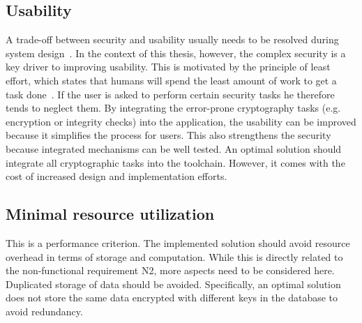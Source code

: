 \documentclass[../main.tex]{subfiles}
\begin{document}
\subsection{Usability}
A trade-off between security and usability usually needs to be resolved during system design~\cite{Braz2007}.
In the context of this thesis, however, the complex security is a key driver to improving usability.
This is motivated by the principle of least effort, which states that humans will spend the least amount of work to get a task done~\cite{Levenson2018}.
If the user is asked to perform certain security tasks he therefore tends to neglect them.
By integrating the error-prone cryptography tasks (e.g. encryption or integrity checks) into the application, the usability can be improved because it simplifies the process for users.
This also strengthens the security because integrated mechanisms can be well tested.
An optimal solution should integrate all cryptographic tasks into the toolchain.
However, it comes with the cost of increased design and implementation efforts.

\subsection{Minimal resource utilization}
This is a performance criterion.
The implemented solution should avoid resource overhead in terms of storage and computation.
While this is directly related to the non-functional requirement N2, more aspects need to be considered here.
Duplicated storage of data should be avoided.
Specifically, an optimal solution does not store the same data encrypted with different keys in the database to avoid redundancy.
\end{document}
